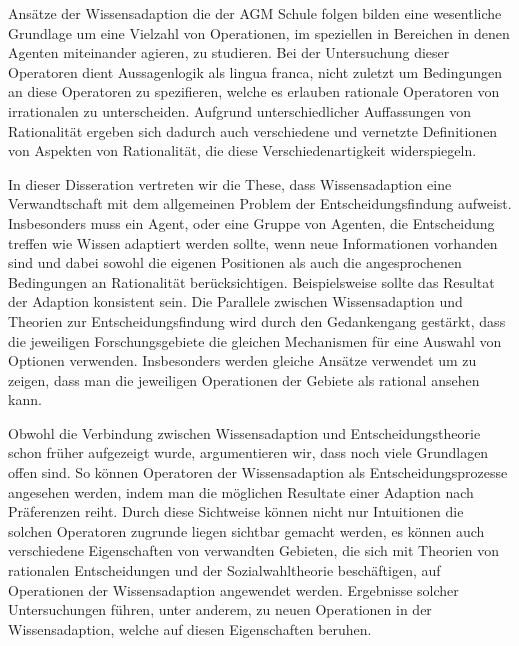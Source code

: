 Ans\"atze der Wissensadaption die der AGM Schule folgen bilden eine wesentliche Grundlage um eine Vielzahl von Operationen, im speziellen in Bereichen in denen Agenten miteinander agieren, zu studieren.  Bei der Untersuchung dieser Operatoren dient Aussagenlogik als lingua franca, nicht zuletzt um Bedingungen an diese Operatoren zu spezifieren, welche es erlauben rationale Operatoren von irrationalen zu unterscheiden. Aufgrund unterschiedlicher Auffassungen von Rationalit\"at ergeben sich dadurch auch verschiedene und vernetzte Definitionen von Aspekten von Rationalit\"at, die diese Verschiedenartigkeit widerspiegeln.

In dieser Disseration vertreten wir die These, dass Wissensadaption eine Verwandtschaft mit dem allgemeinen Problem der Entscheidungsfindung aufweist. Insbesonders muss ein Agent, oder eine Gruppe von Agenten, die Entscheidung treffen wie Wissen adaptiert werden sollte, wenn neue Informationen vorhanden sind und dabei sowohl die eigenen Positionen als auch die angesprochenen Bedingungen an Rationalit\"at ber\"ucksichtigen. Beispielsweise sollte das Resultat der Adaption konsistent sein.  Die Parallele zwischen Wissensadaption und Theorien zur Entscheidungsfindung wird durch den Gedankengang gest\"arkt, dass die jeweiligen Forschungsgebiete die gleichen Mechanismen f\"ur eine Auswahl von Optionen verwenden. Insbesonders werden gleiche Ans\"atze verwendet um zu zeigen, dass man die jeweiligen Operationen der Gebiete als rational ansehen kann.

Obwohl die Verbindung zwischen Wissensadaption und Entscheidungstheorie schon fr\"uher aufgezeigt wurde, argumentieren wir, dass noch viele Grundlagen offen sind. So können Operatoren der Wissensadaption als Entscheidungsprozesse angesehen werden, indem man die möglichen Resultate einer Adaption nach Pr\"aferenzen reiht. Durch diese Sichtweise können nicht nur Intuitionen die solchen Operatoren zugrunde liegen sichtbar gemacht werden, es können auch verschiedene Eigenschaften von verwandten Gebieten, die sich mit Theorien von rationalen Entscheidungen und der Sozialwahltheorie besch\"aftigen, auf Operationen der Wissensadaption angewendet werden. Ergebnisse solcher Untersuchungen f\"uhren, unter anderem, zu neuen Operationen in der Wissensadaption, welche auf diesen Eigenschaften beruhen.

